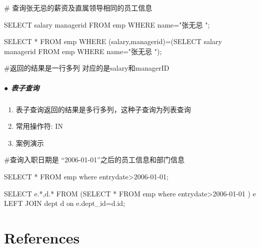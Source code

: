 \documentclass[
  letterpaper,
  DIV=11,
  numbers=noendperiod]{scrreprt}
\let\oldparagraph\paragraph
\renewcommand{\paragraph}[1]{\oldparagraph{#1}\mbox{}}
\newenvironment{Shaded}{\begin{snugshade}}{\end{snugshade}}
\newcommand{\DecValTok}[1]{\textcolor[rgb]{0.68,0.00,0.00}{#1}}
\newcommand{\KeywordTok}[1]{\textcolor[rgb]{0.00,0.23,0.31}{#1}}
\newcommand{\NormalTok}[1]{\textcolor[rgb]{0.00,0.23,0.31}{#1}}
\newcommand{\OperatorTok}[1]{\textcolor[rgb]{0.37,0.37,0.37}{#1}}
\newcommand{\OtherTok}[1]{\textcolor[rgb]{0.00,0.23,0.31}{#1}}
\newcommand{\StringTok}[1]{\textcolor[rgb]{0.13,0.47,0.30}{#1}}
\providecommand{\tightlist}{%
  \setlength{\itemsep}{0pt}\setlength{\parskip}{0pt}}\usepackage{longtable,booktabs,array}
\newlength{\cslhangindent}
\newlength{\cslentryspacingunit} %
\newenvironment{CSLReferences}[2] %
 {%
  \setlength{\parindent}{0pt}
  \ifodd #1
  \let\oldpar\par
  \def\par{\hangindent=\cslhangindent\oldpar}
  \fi
  \setlength{\parskip}{#2\cslentryspacingunit}
 }%
 {}
\begin{document}
\begin{Shaded}
\begin{Highlighting}[]
\NormalTok{\# 查询张无忌的薪资及直属领导相同的员工信息}

\KeywordTok{SELECT}\NormalTok{ salary managerid }\KeywordTok{FROM}\NormalTok{ emp }\KeywordTok{WHERE}\NormalTok{ name}\OperatorTok{=}\OtherTok{"张无忌 "}\NormalTok{;}

\KeywordTok{SELECT} \OperatorTok{*} \KeywordTok{FROM}\NormalTok{ emp }\KeywordTok{WHERE}\NormalTok{ (salary,managerid)}\OperatorTok{=}\NormalTok{(}\KeywordTok{SELECT}\NormalTok{ salary managerid }\KeywordTok{FROM}\NormalTok{ emp }\KeywordTok{WHERE}\NormalTok{ name}\OperatorTok{=}\OtherTok{"张无忌 "}\NormalTok{);}

\NormalTok{\#返回的结果是一行多列 对应的是salary和managerID}
\end{Highlighting}
\end{Shaded}

\hypertarget{ux8868ux5b50ux67e5ux8be2}{%
\paragraph{● 表子查询}\label{ux8868ux5b50ux67e5ux8be2}}

\begin{enumerate}
\def\labelenumi{\arabic{enumi}.}
\tightlist
\item
  表子查询返回的结果是多行多列，这种子查询为列表查询
\item
  常用操作符: IN
\item
  案例演示
\end{enumerate}

\begin{Shaded}
\begin{Highlighting}[]
\NormalTok{\#查询入职日期是 “}\DecValTok{2006}\OperatorTok{{-}}\DecValTok{01}\OperatorTok{{-}}\NormalTok{01”之后的员工信息和部门信息}

\KeywordTok{SELECT} \OperatorTok{*} \KeywordTok{FROM}\NormalTok{ emp }\KeywordTok{where}\NormalTok{ entrydate}\OperatorTok{\textgreater{}}\StringTok{\textquotesingle{}2006{-}01{-}01\textquotesingle{}}\NormalTok{;}

\KeywordTok{SELECT}\NormalTok{ e.}\OperatorTok{*}\NormalTok{,d.}\OperatorTok{*} \KeywordTok{FROM}\NormalTok{ (}\KeywordTok{SELECT} \OperatorTok{*} \KeywordTok{FROM}\NormalTok{ emp }\KeywordTok{where}\NormalTok{ entrydate}\OperatorTok{\textgreater{}}\StringTok{\textquotesingle{}2006{-}01{-}01 \textquotesingle{}}\NormalTok{) e }\KeywordTok{LEFT} \KeywordTok{JOIN}\NormalTok{ dept d }\KeywordTok{on}\NormalTok{ e.dept\_id}\OperatorTok{=}\NormalTok{d.}\KeywordTok{id}\NormalTok{;}
\end{Highlighting}
\end{Shaded}


\hypertarget{references}{%
\chapter*{References}\label{references}}


\hypertarget{refs}{}
\begin{CSLReferences}{0}{0}
\end{CSLReferences}



\printindex
\end{document}

